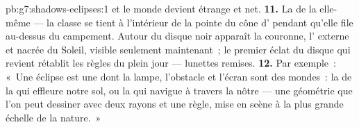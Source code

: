 \begin{solution}{pb:g7:shadows-eclipses:1}
et le monde devient étrange et net.
\textbf{11.} La  de la  elle-même --- la classe se
tient à l'intérieur de la pointe du cône d' pendant qu'elle file
au-dessus du campement. Autour du disque noir apparaît la couronne,
l' externe et nacrée du Soleil, visible seulement
maintenant~; le premier éclat du disque qui revient rétablit les
règles du plein jour --- lunettes remises.
\textbf{12.} Par exemple~: «~Une éclipse est une  dont la lampe,
l'obstacle et l'écran sont des mondes~: la  de la 
qui effleure notre sol, ou la  qui navigue à travers la nôtre ---
une géométrie que l'on peut dessiner avec deux rayons et une règle,
mise en scène à la plus grande échelle de la nature.~»
\end{solution}
